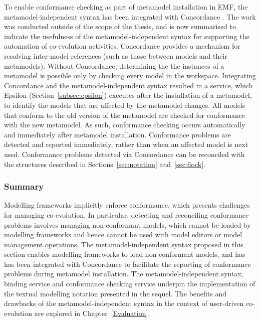 To \cc enable conformance checking as part of metamodel installation in EMF, the metamodel-independent syntax has been integrated with Concordance \cite{rose10concordance}. The work was conducted outside of the scope of the thesis, and is now summarised to indicate the usefulness of the metamodel-independent syntax for supporting the automation of co-evolution activities. Concordance provides a mechanism for resolving inter-model references (such as those between models and their metamodels). Without Concordance, determining the the instances of a metamodel is possible only by checking every model in the workspace. Integrating Concordance and the metamodel-independent syntax resulted in a service, which Epsilon (Section~\ref{subsec:epsilon}) executes after the installation of a metamodel, to identify the models that are affected by the metamodel changes. All models that conform to the old version of the metamodel are checked for conformance with the new metamodel. As such, conformance checking occurs automatically and immediately after metamodel installation. Conformance problems are detected and reported immediately, rather than when an affected model is next used. Conformance problems detected via Concordance can be reconciled with the structures described in Sections~\ref{sec:notation} and~\ref{sec:flock}.

\subsubsection{Summary}
Modelling frameworks implicitly enforce conformance, which presents challenges for managing co-evolution. In particular, detecting and reconciling conformance problems involves managing non-conformant models, which cannot be loaded by modelling frameworks and hence cannot be used with model editors or model management operations. The metamodel-independent syntax proposed in this section enables modelling frameworks to load non-conformant models, and has has been integrated with Concordance \cite{rose10concordance} to facilitate the reporting of conformance problems during metamodel installation. The metamodel-independent syntax, binding service and conformance checking service underpin the implementation of the textual modelling notation presented in the sequel. The benefits and drawbacks of the metamodel-independent syntax in the context of user-driven co-evolution are explored in Chapter~\ref{Evaluation}. 
